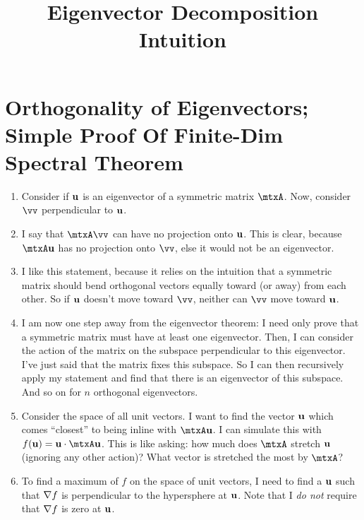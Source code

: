 \documentclass[11pt, oneside]{amsart}
\begin{document}
\title{Eigenvector Decomposition Intuition}
\maketitle


\section{Orthogonality of Eigenvectors; Simple Proof Of Finite-Dim Spectral Theorem}

\begin{enumerate}
  \item Consider if $\bm{\mathrm{u}}$ is an eigenvector of a symmetric matrix
  $\mtxA$. Now, consider $\vv$ perpendicular to $\bm{\mathrm{u}}$.

  \item I say that $\mtxA \vv$ can have no projection onto $\bm{\mathrm{u}}$. This
  is clear, because $\mtxA \vu$ has no projection onto $\vv$, else it
  would not be an eigenvector.

  \item I like this statement, because it relies on the intuition that a
  symmetric matrix should bend orthogonal vectors equally toward (or
  away) from each other. So if $\bm{\mathrm{u}}$ doesn't move toward $\vv$, neither
  can $\vv$ move toward $\bm{\mathrm{u}}$.

  \item I am now one step away from the eigenvector theorem: I need only
  prove that a symmetric matrix must have at least one eigenvector.
  Then, I can consider the action of the matrix on the subspace
  perpendicular to this eigenvector. I've just said that the matrix
  fixes this subspace. So I can then recursively apply my statement and
  find that there is an eigenvector of this subspace. And so on for $n$
  orthogonal eigenvectors.

  \item Consider the space of all unit vectors. I want to find the
  vector $\bm{\mathrm{u}}$ which comes ``closest'' to being inline with $\mtxA\vu$.
  I can simulate this with $\ff{\vu} = \vu \cdot \mtxA\vu$. This is like
  asking: how much does $\mtxA$ stretch $\bm{\mathrm{u}}$ (ignoring any other
  action)? What vector is stretched the most by $\mtxA$?

  \item To find a maximum of $f$ on the space of unit vectors, I need to
  find a $\bm{\mathrm{u}}$ such that $\nabla f$ is perpendicular to the hypersphere
  at $\bm{\mathrm{u}}$. Note that I \emph{do not} require that $\nabla f$ is zero at
  $\bm{\mathrm{u}}$.


\end{enumerate}
\end{document}
